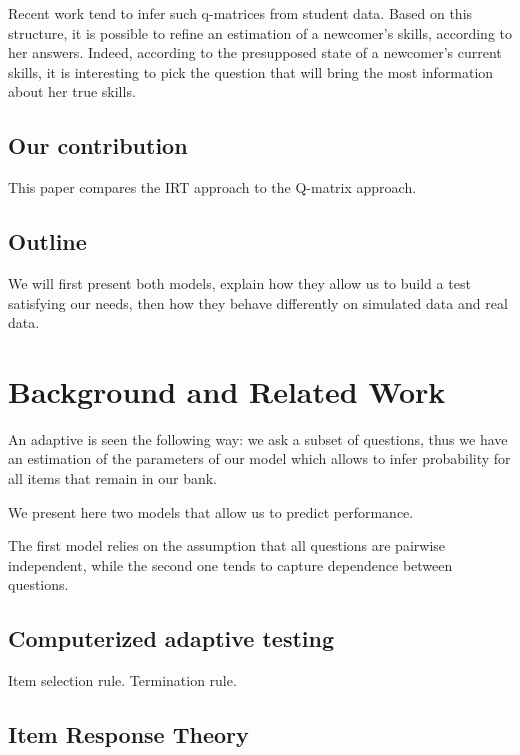 \documentclass{sig-alternate}
\begin{document}
Recent work tend to infer such q-matrices from student data. Based on this structure, it is possible to refine an estimation of a newcomer's skills, according to her answers. Indeed, according to the presupposed state of a newcomer's current skills, it is interesting to pick the question that will bring the most information about her true skills.

\subsection{Our contribution}

This paper compares the IRT approach to the Q-matrix approach.

\subsection{Outline}

We will first present both models, explain how they allow us to build a test satisfying our needs, then how they behave differently on simulated data and real data.

\section{Background and Related Work}

An adaptive is seen the following way: we ask a subset of questions, thus we have an estimation of the parameters of our model which allows to infer probability for all items that remain in our bank.

We present here two models that allow us to predict performance.

The first model relies on the assumption that all questions are pairwise independent, while the second one tends to capture dependence between questions.

\subsection{Computerized adaptive testing}

Item selection rule. Termination rule.

\subsection{Item Response Theory}

\end{document}
